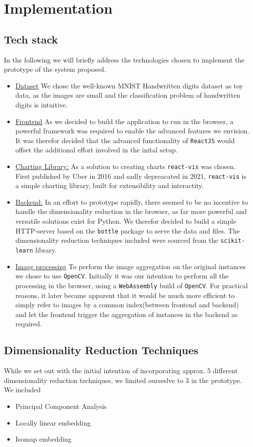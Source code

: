 \documentclass[11pt,a4paper]{article}
\begin{document}
  \section {Implementation}
  \subsection{Tech stack}
    In the following we will briefly address the technologies chosen to implement the prototype of the system proposed.
    
    \begin{itemize}
      \item \underline{Dataset} We chose the well-known MNIST Handwritten digits dataset as toy data, as the images are small and the classification problem of handwritten digits is intuitive.
      \item \underline{Frontend} As we decided to build the application to run in the browser, a powerful framework was required to enable the advanced features we envision. It was therefor decided that the advanced functionality of \texttt{ReactJS} would offset the additional effort involved in the inital setup. 
      \item \underline{Charting Library:} As a solution to creating charts \texttt{react-vis} was chosen. First published by Uber in 2016 and sadly depreacated in 2021, \texttt{react-vis} is a simple charting library, built for extensibility and interactity.
      \item \underline{Backend:} In an effort to prototype rapidly, there seemed to be no incentive to handle the dimensionality reduction in the browser, as far more powerful and versatile solutions exist for Python. We therefor decided to build a simple HTTP-server based on the \texttt{bottle} package to serve the data and files. The dimensionality reduction techniques included were sourced from the \texttt{scikit-learn} library.
      \item \underline{Image processing} To perform the image aggregation on the original instances we chose to use \texttt{OpenCV}. Initially it was our intention to perform all the processing in the browser, using a \texttt{WebAssembly} build of \texttt{OpenCV}. 
      For practical reasons, it later became apparent that it would be much more efficient to simply refer to images by a common index(between frontend and backend) and let the frontend trigger the aggregation of instances in the backend as required. 
    \end{itemize}
  \subsection{Dimensionality Reduction Techniques}
    While we set out with the initial intention of incorporating approx. 5 different dimensionality reduction techniques, we limited ourseslve to 3 in the prototype. We included \begin{itemize}
      \item Principal Component Analysis
      \item Locally linear embedding
      \item Isomap embedding
    \end{itemize}
\end{document}
